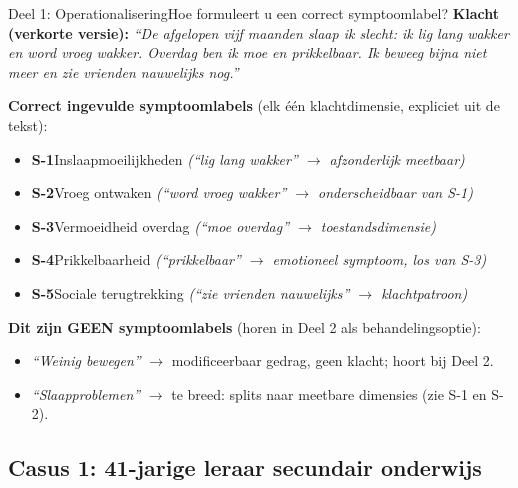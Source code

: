 \documentclass[11pt,a4paper]{article}
\begin{document}
\vspace{0.5em}
\nopagebreak[4]

\begin{voorbeeldbox}{Deel 1: Operationalisering}{Hoe formuleert u een correct symptoomlabel?}
\small
\textbf{Klacht (verkorte versie):} \textit{``De afgelopen vijf maanden slaap ik slecht:
ik lig lang wakker en word vroeg wakker. Overdag ben ik moe en prikkelbaar. Ik beweeg
bijna niet meer en zie vrienden nauwelijks nog.''}

\medskip
\textbf{Correct ingevulde symptoomlabels} (elk één klachtdimensie, expliciet uit de tekst):
\begin{itemize}[topsep=2pt,itemsep=1pt]
\item \textbf{S-1}\enspace Inslaapmoeilijkheden
  \hfill\textit{(``lig lang wakker'' $\rightarrow$ afzonderlijk meetbaar)}
\item \textbf{S-2}\enspace Vroeg ontwaken
  \hfill\textit{(``word vroeg wakker'' $\rightarrow$ onderscheidbaar van S-1)}
\item \textbf{S-3}\enspace Vermoeidheid overdag
  \hfill\textit{(``moe overdag'' $\rightarrow$ toestandsdimensie)}
\item \textbf{S-4}\enspace Prikkelbaarheid
  \hfill\textit{(``prikkelbaar'' $\rightarrow$ emotioneel symptoom, los van S-3)}
\item \textbf{S-5}\enspace Sociale terugtrekking
  \hfill\textit{(``zie vrienden nauwelijks'' $\rightarrow$ klachtpatroon)}
\end{itemize}

\medskip
\textbf{\color{StrongRed}Dit zijn GEEN symptoomlabels} (horen in Deel 2 als behandelingsoptie):
\begin{itemize}[topsep=1pt,itemsep=0pt]
\item \textit{``Weinig bewegen''} $\rightarrow$ modificeerbaar gedrag, geen klacht; hoort bij Deel 2.
\item \textit{``Slaapproblemen''} $\rightarrow$ te breed: splits naar meetbare dimensies (zie S-1 en S-2).
\end{itemize}
\end{voorbeeldbox}

\vspace{0.5em}

\newpage

\subsection*{Casus 1: 41-jarige leraar secundair onderwijs}
\end{document}
